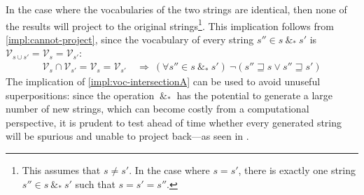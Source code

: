 \documentclass[a4paper,12pt,leqno]{article}
\newcommand{\spasync}{~\&_*~}
\begin{document}
In the case where the vocabularies of the two strings are identical, then none of the results will project to the original strings\footnote{This assumes that $s \neq s'$. In the case where $s = s'$, there is exactly one string $s'' \in s \spasync s'$ such that $s = s' = s''$.}. This implication follows from \cref{impl:cannot-project}, since the vocabulary of every string $s'' \in s \spasync s'$ is $\mathcal{V}_{s \cup s'} = \mathcal{V}_s = \mathcal{V}_{s'}$:
\begin{align}
	\mathcal{V}_s \cap \mathcal{V}_{s'} = \mathcal{V}_s = \mathcal{V}_{s'} &~\Longrightarrow~ (\forall s'' \in s \spasync s')~\lnot (s'' \sqsupseteq s \lor s'' \sqsupseteq s')\label{impl:voc-intersectionA}
\end{align}
The implication of \cref{impl:voc-intersectionA} can be used to avoid unuseful superpositions: since the operation $\spasync$ has the potential to generate a large number of new strings, which can become costly from a computational perspective, it is prudent to test ahead of time whether every generated string will be spurious and unable to project back---as seen in .
\end{document}
